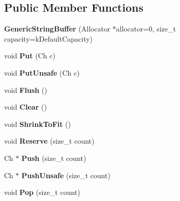 \subsection*{Public Member Functions}
\begin{DoxyCompactItemize}
\item 
{\bfseries Generic\+String\+Buffer} (Allocator $\ast$allocator=0, size\+\_\+t capacity=k\+Default\+Capacity)\hypertarget{a00127_a62f5ea1a53a2a3f98088f8c152b6183e}{}\label{a00127_a62f5ea1a53a2a3f98088f8c152b6183e}

\item 
void {\bfseries Put} (Ch c)\hypertarget{a00127_a8be5c8fadccacdcf40e20220f38e0afa}{}\label{a00127_a8be5c8fadccacdcf40e20220f38e0afa}

\item 
void {\bfseries Put\+Unsafe} (Ch c)\hypertarget{a00127_a9225468d11fdddfc3a9a4e48bf4d3ba4}{}\label{a00127_a9225468d11fdddfc3a9a4e48bf4d3ba4}

\item 
void {\bfseries Flush} ()\hypertarget{a00127_a28bb539487db17b07314a532f3b8847c}{}\label{a00127_a28bb539487db17b07314a532f3b8847c}

\item 
void {\bfseries Clear} ()\hypertarget{a00127_a42f15c959046d899cb74c3120a6995f9}{}\label{a00127_a42f15c959046d899cb74c3120a6995f9}

\item 
void {\bfseries Shrink\+To\+Fit} ()\hypertarget{a00127_a0dbdb77489b95923795011a24f705be5}{}\label{a00127_a0dbdb77489b95923795011a24f705be5}

\item 
void {\bfseries Reserve} (size\+\_\+t count)\hypertarget{a00127_a4d6becae201b98c122746298882a318f}{}\label{a00127_a4d6becae201b98c122746298882a318f}

\item 
Ch $\ast$ {\bfseries Push} (size\+\_\+t count)\hypertarget{a00127_a49fd10cdd5dd97a4cf9813d01334d660}{}\label{a00127_a49fd10cdd5dd97a4cf9813d01334d660}

\item 
Ch $\ast$ {\bfseries Push\+Unsafe} (size\+\_\+t count)\hypertarget{a00127_a4e396f55323ca54f949685c7c6ef2060}{}\label{a00127_a4e396f55323ca54f949685c7c6ef2060}

\item 
void {\bfseries Pop} (size\+\_\+t count)\hypertarget{a00127_a0038e53ba03c271bc4cbbac403ec4de4}{}\label{a00127_a0038e53ba03c271bc4cbbac403ec4de4}


\end{DoxyCompactItemize}

